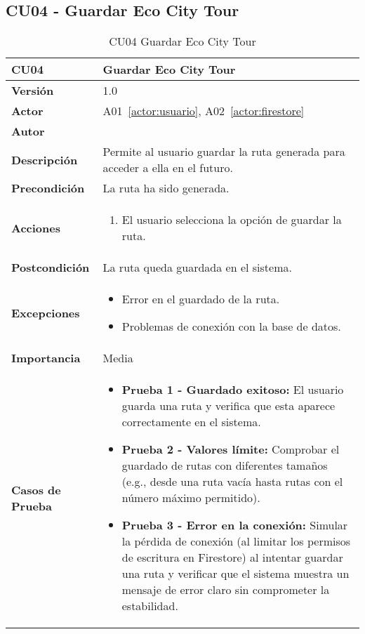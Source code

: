 \subsection{CU04 - Guardar Eco City Tour}
\begin{table}[H]
	\centering
	
	\begin{tabularx}{\linewidth}{ p{} p{} }
		\toprule
		\textbf{CU04}    & \textbf{Guardar Eco City Tour} \\
		\toprule
		\textbf{Versión}              & 1.0    \\
		\textbf{Actor}                & A01~\ref{actor:usuario}, A02~\ref{actor:firestore} \\
		\textbf{Autor}                & \autor \\
		\textbf{Descripción}          & Permite al usuario guardar la ruta generada para acceder a ella en el futuro. \\
		\textbf{Precondición}         & La ruta ha sido generada. \\
		\textbf{Acciones}             &
		\begin{enumerate}
			\def\labelenumi{\arabic{enumi}.}
			\tightlist
			\item El usuario selecciona la opción de guardar la ruta.
		\end{enumerate}\\
		\textbf{Postcondición}        & La ruta queda guardada en el sistema. \\
		\textbf{Excepciones}          & 
		\begin{itemize}
			\tightlist
			\item Error en el guardado de la ruta.
			\item Problemas de conexión con la base de datos.
		\end{itemize}\\
		\textbf{Importancia}          & Media \\
		\textbf{Casos de Prueba}      &
		\begin{itemize}
			\item \textbf{Prueba 1 - Guardado exitoso:} El usuario guarda una ruta y verifica que esta aparece correctamente en el sistema.
			\vspace{2pt}
			\item \textbf{Prueba 2 - Valores límite:} Comprobar el guardado de rutas con diferentes tamaños (e.g., desde una ruta vacía hasta rutas con el número máximo permitido).
			\vspace{2pt}
			\item \textbf{Prueba 3 - Error en la conexión:} Simular la pérdida de conexión (al limitar los permisos de escritura en Firestore) al intentar guardar una ruta y verificar que el sistema muestra un mensaje de error claro sin comprometer la estabilidad.
		\end{itemize} \\
		\bottomrule
	\end{tabularx}
	\caption{CU04 Guardar Eco City Tour}
	\label{cu:guardar-tour}
\end{table}


